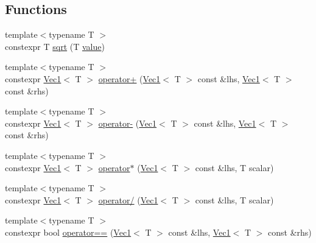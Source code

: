 \subsection*{Functions}
\begin{DoxyCompactItemize}
\item 
{\footnotesize template$<$typename T $>$ }\\constexpr T \mbox{\hyperlink{namespace_saturn_1_1_math_aadd63a3c5022270cc7837d2583cb888d}{sqrt}} (T \mbox{\hyperlink{glad_8h_a7ab00df62abe96de01795dc0d15959db}{value}})
\item 
{\footnotesize template$<$typename T $>$ }\\constexpr \mbox{\hyperlink{namespace_saturn_1_1_math_acae4f808f0c3284d0b60ee1ac720deaa}{Vec1}}$<$ T $>$ \mbox{\hyperlink{namespace_saturn_1_1_math_af62e54a4d566d6102eaed7d3495b89cf}{operator+}} (\mbox{\hyperlink{namespace_saturn_1_1_math_acae4f808f0c3284d0b60ee1ac720deaa}{Vec1}}$<$ T $>$ const \&lhs, \mbox{\hyperlink{namespace_saturn_1_1_math_acae4f808f0c3284d0b60ee1ac720deaa}{Vec1}}$<$ T $>$ const \&rhs)
\item 
{\footnotesize template$<$typename T $>$ }\\constexpr \mbox{\hyperlink{namespace_saturn_1_1_math_acae4f808f0c3284d0b60ee1ac720deaa}{Vec1}}$<$ T $>$ \mbox{\hyperlink{namespace_saturn_1_1_math_aee745503d5ed41b38b7c64d6ead34c2e}{operator-\/}} (\mbox{\hyperlink{namespace_saturn_1_1_math_acae4f808f0c3284d0b60ee1ac720deaa}{Vec1}}$<$ T $>$ const \&lhs, \mbox{\hyperlink{namespace_saturn_1_1_math_acae4f808f0c3284d0b60ee1ac720deaa}{Vec1}}$<$ T $>$ const \&rhs)
\item 
{\footnotesize template$<$typename T $>$ }\\constexpr \mbox{\hyperlink{namespace_saturn_1_1_math_acae4f808f0c3284d0b60ee1ac720deaa}{Vec1}}$<$ T $>$ \mbox{\hyperlink{namespace_saturn_1_1_math_a31358268c3450500daebffe0406bf72f}{operator$\ast$}} (\mbox{\hyperlink{namespace_saturn_1_1_math_acae4f808f0c3284d0b60ee1ac720deaa}{Vec1}}$<$ T $>$ const \&lhs, T scalar)
\item 
{\footnotesize template$<$typename T $>$ }\\constexpr \mbox{\hyperlink{namespace_saturn_1_1_math_acae4f808f0c3284d0b60ee1ac720deaa}{Vec1}}$<$ T $>$ \mbox{\hyperlink{namespace_saturn_1_1_math_a58c8caefb06db356a2881414badfea9a}{operator/}} (\mbox{\hyperlink{namespace_saturn_1_1_math_acae4f808f0c3284d0b60ee1ac720deaa}{Vec1}}$<$ T $>$ const \&lhs, T scalar)
\item 
{\footnotesize template$<$typename T $>$ }\\constexpr bool \mbox{\hyperlink{namespace_saturn_1_1_math_a9476ffa60b25f7c48a8361e146bb0833}{operator==}} (\mbox{\hyperlink{namespace_saturn_1_1_math_acae4f808f0c3284d0b60ee1ac720deaa}{Vec1}}$<$ T $>$ const \&lhs, \mbox{\hyperlink{namespace_saturn_1_1_math_acae4f808f0c3284d0b60ee1ac720deaa}{Vec1}}$<$ T $>$ const \&rhs)

\end{DoxyCompactItemize}
